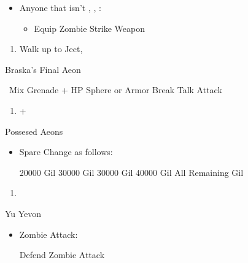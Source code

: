 \begin{multicols}{2}
\begin{equip}
\begin{itemize}
\item Anyone that isn't \tidus, \yuna, \auron:
\begin{itemize}
\item Equip Zombie Strike Weapon
\end{itemize}
\end{itemize}
\end{equip}
\begin{enumerate}[resume]
  \item Walk up to Ject, \cs[4:30]
\end{enumerate}
\begin{battle}[180000]{Braska's Final Aeon}
          \begin{itemize}
            \switch{\yuna}{\rikku}
            \rikkuf \od\ Mix Grenade + HP Sphere or Armor Break
            \tidusf Talk
            \switch{\auron}{\yuna}
            \summon{\bahamut}
            \bahamutf Attack
  \end{itemize}
\end{battle}
\begin{enumerate}[resume]
  \item \cs+\skippablefmv[4:00]
\end{enumerate}
\begin{battle}{Possesed Aeons}
          \begin{itemize}
            \item Spare Change as follows:
                  \begin{itemize}
                    \valeforf \num{20000} Gil
                    \ifritf \num{30000} Gil
                    \ixilonf \num{30000} Gil
                    \bahamutf \num{40000} Gil
                    \shivaf All Remaining Gil
                  \end{itemize}
  \end{itemize}
\end{battle}
\begin{enumerate}[resume]
  \item \cs[1:40]
\end{enumerate}
\begin{battle}[99999]{Yu Yevon}
  \begin{itemize}
   \item Zombie Attack:
   \begin{itemize}
   \yunaf Defend
   \tidusf Zombie Attack
   \end{itemize}

\end{itemize}
\end{battle}
\end{multicols}
